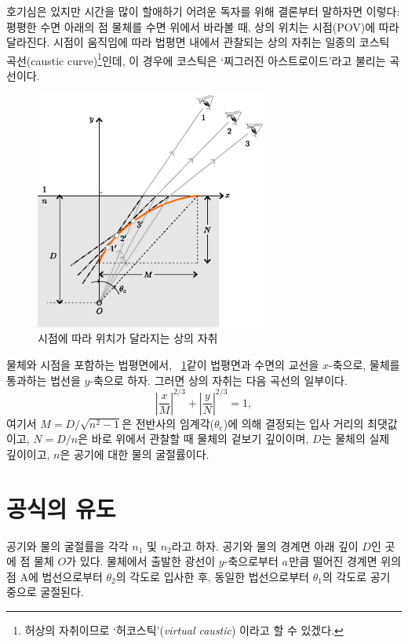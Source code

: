 \documentclass[twocolumn]{article}
\begin{document}
호기심은 있지만 시간을 많이 할애하기 어려운 독자를 위해 결론부터 말하자면 이렇다:  
평평한 수면 아래의 점 물체를 수면 위에서 바라볼 때, 상의 위치는 시점(POV)에 따라 달라진다. 
시점이 움직임에 따라 법평면 내에서 관찰되는 상의 자취는 일종의  코스틱 곡선(caustic curve)\footnote{허상의 
자취이므로 `허코스틱'(\emph{virtual caustic}) 이라고 할 수 있겠다.}인데, 이 경우에 
코스틱은 `찌그러진 아스트로이드'라고 불리는 곡선이다.
	
\begin{figure}
	\centering
	\includegraphics[width=3in]{figs/g409.eps}
	\caption{시점에 따라 위치가 달라지는 상의 자취}
	\label{fig:caustic}
\end{figure}

물체와 시점을 포함하는 법평면에서, \figurename\ \ref{fig:caustic}\과 같이 법평면과 수면의 교선을 $x$-축으로, 
물체를 통과하는 법선을 $y$-축으로 하자. 그러면 상의 자취는 다음 곡선의 일부이다.
	$$ \left| \dfrac{x}{M} \right| ^ {2/3} 
	+ \left| \dfrac{y}{N} \right| ^ {2/3} = 1,$$
여기서 $M = D/\sqrt{n^2 - 1}$은 전반사의 임계각($\theta_{\mathrm{c}}$)에 의해 결정되는 입사 거리의 최댓값이고, 
$N = D/n$은 바로 위에서 관찰할 때 물체의 겉보기 깊이이며, 
$D$는 물체의 실제 깊이이고, $n$은 공기에 대한 물의 굴절률이다.
	
\section{공식의 유도}
	
공기와 물의 굴절률을 각각 $n_1$ 및 $n_2$라고 하자. 공기와 물의 경계면 아래 깊이 $D$인 곳에 점 물체 $O$가 있다. 
물체에서 출발한 광선이 $y$-축으로부터 ${a}$만큼 떨어진 경계면 위의 점 A에 
법선으로부터 $\theta_2$의 각도로 입사한 후, 동일한 법선으로부터 $\theta_1$의 각도로 공기 중으로 굴절된다. 
\end{document}
